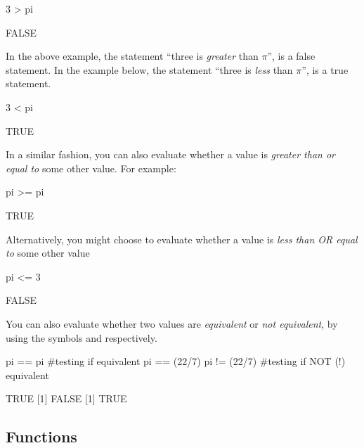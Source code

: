 %

\begin{inR}
3 > pi
\end{inR}
\begin{outR}
[1] FALSE
\end{outR}

\noindent
In the above example, the statement ``three is \textit{greater} than $\pi$'', is a false statement.  In the example below, the statement ``three is \textit{less} than $\pi$'', is a true statement.

\begin{inR}
3 < pi
\end{inR}
\begin{outR}
[1] TRUE
\end{outR}

\noindent
In a similar fashion, you can also evaluate whether a value is \textit{greater than or equal to} some other value. For example:

\begin{inR}
pi >= pi
\end{inR}
\begin{outR}
[1] TRUE
\end{outR}

\noindent
Alternatively, you might choose to evaluate whether a value is \textit{less than OR equal to} some other value

\begin{inR}
pi <= 3
\end{inR}
\begin{outR}
[1] FALSE
\end{outR}

\noindent
You can also evaluate whether two values are \textit{equivalent} or \textit{not equivalent}, by using the symbols \R{==} and \R{!=} respectively.

\begin{inR}
pi == pi #testing if equivalent
pi == (22/7)
pi != (22/7) #testing if NOT (!) equivalent
\end{inR}
\begin{outR}
[1] TRUE
[1] FALSE
[1] TRUE
\end{outR}



\subsection{Functions}
\label{sec:functions}

